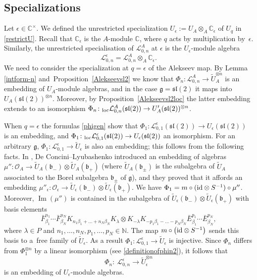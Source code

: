 \documentclass[pdftex]{sigma}%
\numberwithin{equation}{section}
\numberwithin{figure}{section}
\newcommand{\e}{\epsilon}
\newcommand{\mc}{\mathbb{C}}
\newcommand{\Ll}{{\mathcal L}}
\newcommand{\Oo}{{\mathcal O}}
\newcommand{\ra}{\rightarrow}
\begin{document}
\subsection{Specializations}
Let $\epsilon\in {\mathbb C}^\times$. We defined the unrestricted specialization $U_\epsilon := U_A \otimes_A \mc_\e$ of $U_q$ in \eqref{restrictU}. Recall that ${\mathbb C}_{\e}$ is the $A$-module ${\mathbb C}$, where $q$ acts by multiplication by~$\e$. Similarly, the unrestricted specialisation of $\Ll_{0,n}^A$ at $\e$ is the $U_\epsilon$-module algebra
\begin{equation*}%
 \Ll_{0,n}^\e =\Ll_{0,n}^A\otimes_A {\mathbb C}_{\e}.
 \end{equation*}
We need to consider the specialization at $q=\e$ of the Alekseev map. By Lemma \ref{intform-n} and~Pro\-position~\ref{Alekseevsl2} we know that $\Phi_n\colon \Ll_{0,n}^A\ra \tilde{U}_A^{\otimes n}$ is an embedding of $U_A$-module algebras, and in the case $\mathfrak{g}={\mathfrak{sl}}(2)$ it maps into $U_A({\mathfrak{sl}}(2))^{{\otimes} n}$. Moreover, by Proposition~\ref{Alekseevsl2loc} the latter embedding extends to an isomorphism $\Phi_n\colon {}_{\rm loc}\Ll_{0,n}^A({\mathfrak{sl}}(2))\ra U_A'({\mathfrak{sl}}(2))^{{\otimes} n}$.

When $q=\e$ the formulas \eqref{phigen} show that $\Phi_1\colon \Ll_{0,1}^\e({\mathfrak{sl}}(2))\ra U_\e({\mathfrak{sl}}(2))$ is an embedding, and $\Phi_1\colon {}_{\rm loc}\Ll_{0,1}^\e({\mathfrak{sl}}(2))\ra U_\e({\mathfrak{sl}}(2))$ an isomorphism. For an arbitrary $\mathfrak{g}$, $\Phi_1\colon \Ll_{0,1}^\e\ra \tilde{U}_\e$ is also an embedding; this follows from the following facts. In \cite[ Sections 4 and 6]{DC-L}, De Concini--Lyubashenko introduced an embedding of algebras $\mu''\colon \Oo_A \ra \tilde U_A(\mathfrak{b}_-)\otimes \tilde U_A(\mathfrak{b}_+)$ (where $\tilde U_A(\mathfrak{b}_\pm)$ is the subalgebra of $\tilde U_A$ associated to the Borel subalgebra $\mathfrak{b}_\pm$ of $\mathfrak{g}$), and they proved that it affords an embedding $\mu''_\e\colon \Oo_\e \ra \tilde U_\e(\mathfrak{b}_-)\otimes \tilde U_\e(\mathfrak{b}_+)$. We have $\Phi_1 = m \circ ({\rm id} \otimes S^{-1})\circ \mu''$. Moreover, $\operatorname{Im}(\mu'')$ is contained in the subalgebra of $\tilde U_\e(\mathfrak{b}_-)\otimes \tilde U_\e(\mathfrak{b}_+)$ with basis elements
\[
\bar{F}_{\beta_1}^{n_1}\cdots \bar{F}_{\beta_N}^{n_N}K_{n_1\beta_1+\dots+ n_N \beta_N}K_{\lambda}\otimes K_{-\lambda}K_{-p_1\beta_1-\dots- p_N \beta_N}\bar{E}_{\beta_1}^{p_1}\cdots \bar{E}_{\beta_N}^{p_N},
\]
where $\lambda\in P$ and $n_1,\dots,n_N, p_1,\dots,p_N \in {\mathbb N}$. The map $m \circ \big({\rm id} \otimes S^{-1}\big)$ sends this basis to a~free family of $\tilde U_\e$. As a result $\Phi_1\colon \Ll_{0,1}^\e\ra \tilde{U}_\e$ is injective. Since $\Phi_n$ differs from $\Phi_1^{\otimes n}$ by a linear isomorphism (see \eqref{definitionofphin2}), it follows that{\samepage
\[
\Phi_n\colon\ \Ll_{0,n}^\e\to \tilde U_\epsilon^{\otimes n}
\]
is an embedding of $U_\epsilon$-module algebras.}
\end{document}
